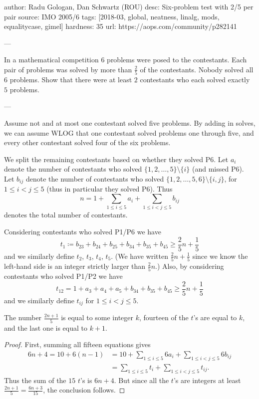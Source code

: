 author: Radu Gologan, Dan Schwartz (ROU)
desc: Six-problem test with 2/5 per pair
source: IMO 2005/6
tags: [2018-03, global, neatness, linalg, mods, equalitycase, gimel]
hardness: 35
url: https://aops.com/community/p282141

---

In a mathematical competition $6$ problems were posed to the contestants.
Each pair of problems was solved by more than $\frac{2}{5}$ of the contestants.
Nobody solved all 6 problems.
Show that there were at least $2$ contestants
who each solved exactly $5$ problems.

---

Assume not and at most one contestant solved five problems.
By adding in solves,
we can assume WLOG that one contestant solved problems one through five,
and every other contestant solved four of the six problems.

We split the remaining contestants based on whether they solved P6.
Let $a_i$ denote the number of contestants who solved
$\{1,2,\dots,5\} \setminus \{i\}$ (and missed P6).
Let $b_{ij}$ denote the number of contestants who solved
$\{1,2,\dots,5,6\} \setminus \{i,j\}$, for $1 \le i < j \le 5$
(thus in particular they solved P6).
Thus
\[ n = 1 + \sum_{1 \le i \le 5} a_i + \sum_{1 \le i < j \le 5} b_{ij} \]
denotes the total number of contestants.

Considering contestants who solved P1/P6 we have
\[ t_1 \coloneqq b_{23} + b_{24} + b_{25} + b_{34} + b_{35} + b_{45} \ge \frac25n + \frac15 \]
and we similarly define $t_2$, $t_3$, $t_4$, $t_5$.
(We have written $\frac25n+\frac15$ since we know
the left-hand side is an integer strictly larger than $\frac25n$.)
Also, by considering contestants who solved P1/P2 we have
\[ t_{12} = 1 + a_{3} + a_{4} + a_{5} + b_{34} + b_{35} + b_{45}
  \ge \frac25n + \frac15 \]
and we similarly define $t_{ij}$ for $1 \le i < j \le 5$.

\begin{claim*}
  The number $\frac{2n+1}{5}$ is equal to some integer $k$,
  fourteen of the $t$'s are equal to $k$,
  and the last one is equal to $k+1$.
\end{claim*}
\begin{proof}
First, summing all fifteen equations gives
  \begin{align*}
    6n+4 = 10 + 6(n-1) &= 10
      + \sum_{1 \le i \le 5} 6a_i + \sum_{1 \le i < j \le 5} 6b_{ij} \\
      &= \sum_{1 \le i \le 5} t_i + \sum_{1 \le i < j \le 5} t_{ij}.
  \end{align*}
  Thus the sum of the $15$ $t$'s is $6n+4$.
  But since all the $t$'s are integers at least
  $\frac{2n+1}{5} = \frac{6n+3}{15}$, the conclusion follows.
\end{proof}


